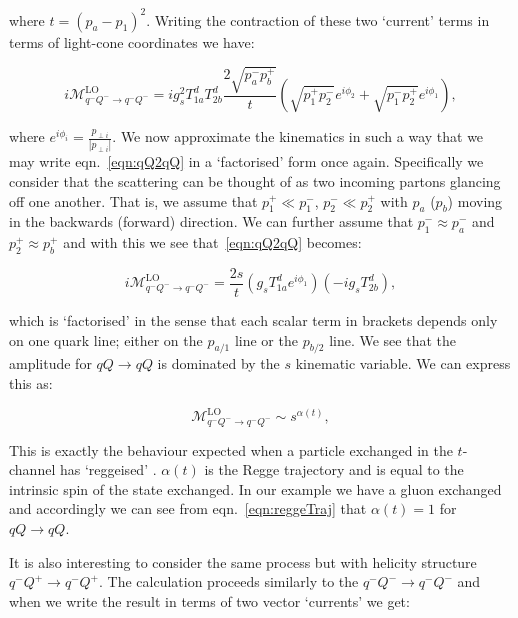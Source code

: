 	where $t = (p_a - p_1)^2$.  Writing the contraction of these two `current'
	terms in terms of light-cone coordinates we have:

	\begin{equation}
		i\mathcal{M}_{q^-Q^-\rightarrow q^-Q^-}^{\text{LO}} = ig_s^2T^d_{1a}T^d_{2b}
		\frac{2\sqrt{p_a^-p_b^+}}{t}
		\left(\sqrt{p_1^+p_2^-}e^{i\phi_2} + \sqrt{p_1^-p_2^+}e^{i\phi_1}\right),
		\label{eqn:qQ2qQ}
	\end{equation}

	where $e^{i\phi_i} = \frac{p_{\perp i}}{|p_{\perp i}|}$.  We now approximate the kinematics
	in such a way that we may write eqn.~\eqref{eqn:qQ2qQ} in a `factorised' form once again.
	Specifically we consider that the scattering can be thought of as two incoming partons glancing off
	one another.  That is, we assume that $p_1^+\ll p_1^-$, $p_2^-\ll p_2^+$ with $p_a$ ($p_b$)
	moving in the backwards (forward) direction.  We can further assume that $p_1^-\approx p_a^-$
	and $p_2^+\approx p_b^+$ and with this we see that~\eqref{eqn:qQ2qQ} becomes:

	\begin{equation}
		i\mathcal{M}_{q^-Q^-\rightarrow q^-Q^-}^{\text{LO}} =
		\frac{2s}{t}\left(g_sT^d_{1a}e^{i\phi_1}\right)\left(-ig_sT^d_{2b}\right),
		\label{eqn:reggeTraj}
	\end{equation}

	which is `factorised' in the sense that each scalar term in brackets depends only on one
	quark line; either on the $p_{a/1}$ line or the $p_{b/2}$ line.  We see that the amplitude
	for $qQ\rightarrow qQ$ is dominated by the $s$ kinematic variable.  We can express this as:

	\begin{equation}
		\mathcal{M}_{q^-Q^-\rightarrow q^-Q^-}^{\text{LO}} \sim s^{\alpha(t)},
	\end{equation}

	This is exactly the behaviour expected when a particle exchanged in the $t$-channel has `reggeised'
	\cite{sabioThesis,DelDuca:1995hf,lipatovBook}.  $\alpha(t)$ is the Regge trajectory and is equal to
	the intrinsic spin of the state exchanged.  In our example we have a gluon exchanged
	and accordingly we can see from eqn.~\eqref{eqn:reggeTraj} that $\alpha(t)=1$ for $qQ\rightarrow qQ$.

	It is also interesting to consider the same process but with helicity structure $q^-Q^+\to q^-Q^+$.
	The calculation proceeds similarly to the $q^-Q^-\to q^-Q^-$ and when we write the result in
	terms of two vector `currents' we get:

